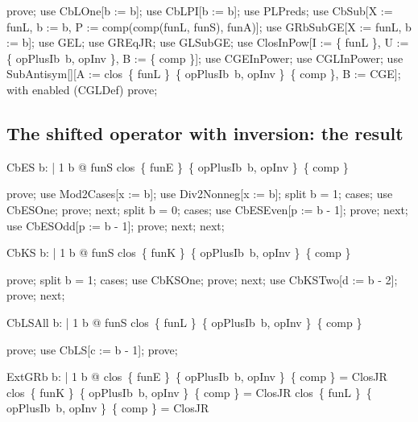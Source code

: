 \documentclass{article}
\begin{document}
\begin{zproof}
prove;
use CbLOne[b := b];
use CbLPI[b := b];
use PLPreds;
use CbSub[X := funL, b := b, P := comp(comp(funL, funS), funA)];
use GRbSubGE[X := funL, b := b];
use GEL;
use GREqJR;
use GLSubGE;
use ClosInPow[I := \{ funL \}, U := \{ opPlusIb~b, opInv \}, B := \{ comp \}];
use CGEInPower;
use CGLInPower;
use SubAntisym[\nat \fun \nat][A := clos~\{ funL \}~\{ opPlusIb~b, opInv \}~\{ comp \}, B := CGE];
with enabled (CGLDef) prove;
\end{zproof}

\subsection{The shifted operator with inversion: the result}

\begin{theorem}{CbES}
  \forall b: \nat | 1 \leq b @ funS \in clos~\{ funE \}~\{ opPlusIb~b, opInv \}~\{ comp \}
\end{theorem}

\begin{zproof}
prove;
use Mod2Cases[x := b];
use Div2Nonneg[x := b];
split b = 1;
cases;
use CbESOne;
prove;
next;
split b  = 0;
cases;
use CbESEven[p := b  - 1];
prove;
next;
use CbESOdd[p := b  - 1];
prove;
next;
next;
\end{zproof}

\begin{theorem}{CbKS}
  \forall b: \nat | 1 \leq b @ funS \in clos~\{ funK \}~\{ opPlusIb~b, opInv \}~\{ comp \}
\end{theorem}

\begin{zproof}
prove;
split b = 1;
cases;
use CbKSOne;
prove;
next;
use CbKSTwo[d := b - 2];
prove;
next;
\end{zproof}

\begin{theorem}{CbLSAll}
  \forall b: \nat | 1 \leq b @ funS \in clos~\{ funL \}~\{ opPlusIb~b, opInv \}~\{ comp \}
\end{theorem}

\begin{zproof}
prove;
use CbLS[c := b - 1];
prove;
\end{zproof}

\begin{theorem}{ExtGRb}
  \forall b: \nat | 1 \leq b @ clos~\{ funE \}~\{ opPlusIb~b, opInv \}~\{ comp \} = ClosJR \land clos~\{ funK \}~\{ opPlusIb~b, opInv \}~\{ comp \} = ClosJR \land clos~\{ funL \}~\{ opPlusIb~b, opInv \}~\{ comp \} = ClosJR
\end{theorem}
\end{document}

